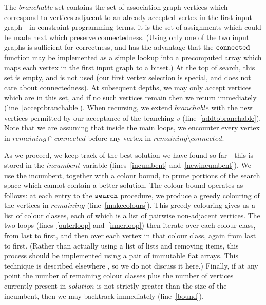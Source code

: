 \documentclass{llncs}
\newcommand{\lineref}[1]{line~\ref{#1}}
\newcommand{\twolinesref}[2]{lines~\ref{#1} and~\ref{#2}}
\begin{document}
The $\mathit{branchable}$ set contains the set of association graph vertices which correspond to
vertices adjacent to an already-accepted vertex in the first input graph---in constraint programming terms, it is the
set of assignments which could be made next which preserve connectedness. (Using only one of the two
input graphs is sufficient for correctness, and has the advantage that the $\FuncSty{connected}$
function may be implemented as a simple lookup into a precomputed array which maps each vertex in
the first input graph to a bitset.) At the top of search, this set is empty, and is not used (our
first vertex selection is special, and does not care about connectedness). At subsequent depths, we
may only accept vertices which are in this set, and if no such vertices remain then we return
immediately (\lineref{acceptbranchable}). When recursing, we extend $\mathit{branchable}$ with the
new vertices permitted by our acceptance of the branching $v$ (\lineref{addtobranchable}). Note that
we are assuming that inside the main loops, we encounter every vertex in $\mathit{remaining} \cap
\mathit{connected}$ before any vertex in $\mathit{remaining} \setminus \mathit{connected}$.

As we proceed, we keep track of the best solution we have found so far---this is stored in the
$\mathit{incumbent}$ variable (\twolinesref{incumbent}{newincumbent}). We use the incumbent,
together with a colour bound, to prune portions of the search space which cannot contain a better
solution. The colour bound operates as follows: at each entry to the $\FuncSty{search}$ procedure,
we produce a greedy colouring of the vertices in $\mathit{remaining}$ (\lineref{makecolours}). This
greedy colouring gives us a list of colour classes, each of which is a list of pairwise non-adjacent
vertices. The two loops (\twolinesref{outerloop}{innerloop}) then iterate over each colour class,
from last to first, and then over each vertex in that colour class, again from last to first.
(Rather than actually using a list of lists and removing items, this process should be implemented
using a pair of immutable flat arrays. This technique is described elsewhere
\cite{DBLP:conf/cp/McCreeshP14}, so we do not discuss it here.) Finally, if at any point the number
of remaining colour classes plus the number of vertices currently present in $\mathit{solution}$ is
not strictly greater than the size of the incumbent, then we may backtrack immediately
(\lineref{bound}).
\end{document}
